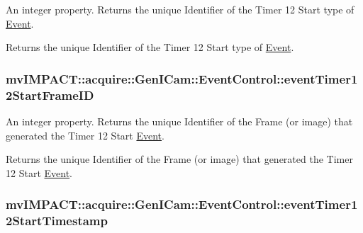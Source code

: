 An integer property. Returns the unique Identifier of the Timer 12 Start type of \hyperlink{classmv_i_m_p_a_c_t_1_1acquire_1_1_event}{Event}. 

Returns the unique Identifier of the Timer 12 Start type of \hyperlink{classmv_i_m_p_a_c_t_1_1acquire_1_1_event}{Event}. \hypertarget{classmv_i_m_p_a_c_t_1_1acquire_1_1_gen_i_cam_1_1_event_control_a9b74ab79f35119709de47396fb6d09a1}{
\subsubsection[{event\+Timer12\+Start\+Frame\+I\+D}]{ mv\+I\+M\+P\+A\+C\+T\+::acquire\+::\+Gen\+I\+Cam\+::\+Event\+Control\+::event\+Timer12\+Start\+Frame\+I\+D}}\label{classmv_i_m_p_a_c_t_1_1acquire_1_1_gen_i_cam_1_1_event_control_a9b74ab79f35119709de47396fb6d09a1}


An integer property. Returns the unique Identifier of the Frame (or image) that generated the Timer 12 Start \hyperlink{classmv_i_m_p_a_c_t_1_1acquire_1_1_event}{Event}. 

Returns the unique Identifier of the Frame (or image) that generated the Timer 12 Start \hyperlink{classmv_i_m_p_a_c_t_1_1acquire_1_1_event}{Event}. \hypertarget{classmv_i_m_p_a_c_t_1_1acquire_1_1_gen_i_cam_1_1_event_control_a37d2563b038e3e2873fd5890ba8b063a}{
\subsubsection[{event\+Timer12\+Start\+Timestamp}]{ mv\+I\+M\+P\+A\+C\+T\+::acquire\+::\+Gen\+I\+Cam\+::\+Event\+Control\+::event\+Timer12\+Start\+Timestamp}}\label{classmv_i_m_p_a_c_t_1_1acquire_1_1_gen_i_cam_1_1_event_control_a37d2563b038e3e2873fd5890ba8b063a}



